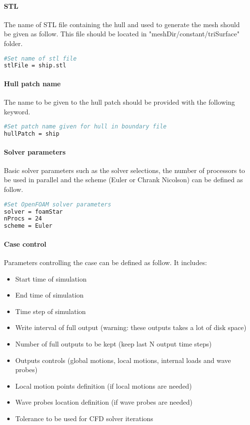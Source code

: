 \paragraph{STL}
The name of STL file containing the hull and used to generate the mesh should be given as follow. This file should be located in "meshDir/constant/triSurface" folder.
\begin{lstlisting}[language=bash]
#Set name of stl file
stlFile = ship.stl
\end{lstlisting}

\paragraph{Hull patch name}
The name to be given to the hull patch should be provided with the following keyword.
\begin{lstlisting}[language=bash]
#Set patch name given for hull in boundary file
hullPatch = ship
\end{lstlisting}

\paragraph{Solver parameters}
Basic solver parameters such as the solver selections, the number of processors to be used in parallel and the scheme (Euler or Chrank Nicolson) can be defined as follow.
\begin{lstlisting}[language=bash]
#Set OpenFOAM solver parameters 
solver = foamStar
nProcs = 24
scheme = Euler
\end{lstlisting}

\paragraph{Case control}
Parameters controlling the case can be defined as follow. It includes:
\begin{itemize}
\item Start time of simulation
\item End time of simulation
\item Time step of simulation
\item Write interval of full output (warning: these outputs takes a lot of disk space)
\item Number of full outputs to be kept (keep last N output time steps)
\item Outputs controls (global motions, local motions, internal loads and wave probes)
\item Local motion points definition (if local motions are needed)
\item Wave probes location definition (if wave probes are needed)
\item Tolerance to be used for CFD solver iterations
\end{itemize}

